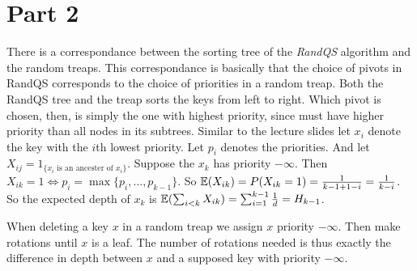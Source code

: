 
\section*{Part 2}

There is a correspondance between the sorting tree of the \emph{RandQS} algorithm
and the random treaps.
This correspondance is basically that the choice of pivots in RandQS
corresponds to the choice of priorities in a random treap.
Both the RandQS tree and the treap sorts the keys from left to right.
Which pivot is chosen, then, is simply the one with highest priority,
since must have higher priority than all nodes in its subtrees.
Similar to the lecture slides let $x_i$ denote the key with the
$i$th lowest priority.
Let $p_i$ denotes the priorities.
And let $X_{ij} = 1_{\{x_i \text{ is an ancester of } x_i\}}$.
Suppose the $x_k$ has priority $-\infty$.
Then $ X_{ik} = 1 \iff p_i = \max\{p_i, \dots, p_{k-1} \} $.
So $\mathbb{E}(X_{ik}) = P(X_{ik} = 1) = \frac{1}{k - 1 + 1 - i} = \frac{1}{k - i}$.
So the expected depth of $x_k$ is
$ \mathbb{E}(\sum_{i<k} X_{ik}) = \sum_{i=1}^{k-1} \frac{1}{d} = H_{k-1} $.

When deleting a key $x$ in a random treap we assign $x$ priority $-\infty$.
Then make rotations until $x$ is a leaf.
The number of rotations needed is thus exactly the difference in depth between
$x$ and a supposed key with priority $-\infty$.
